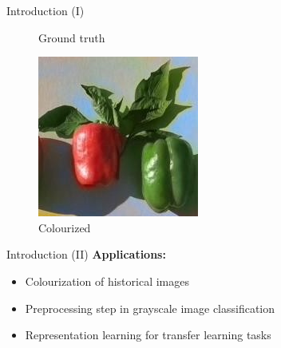 \documentclass{beamer}
\begin{document}
\begin{frame}{Introduction (I)}
\begin{figure}[!htb]
      \caption{Ground truth}
    \endminipage\hfill
      \includegraphics[width=\linewidth]{resources/colored.jpg}
      \caption{Colourized}
    \endminipage
  \end{figure}
\end{frame}

\begin{frame}{Introduction (II)}
  \textbf{Applications:}
    \begin{itemize}
        \item Colourization of historical images
        \item Preprocessing step in grayscale image classification
        \item Representation learning for transfer learning tasks
    \end{itemize}
\end{frame}

\end{document}

